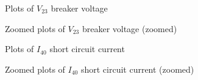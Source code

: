\documentclass[10pt, oneside, letterpaper]{article}
\begin{document}
\begin{figure}[H]
    \begin{center}
        
    \end{center}
    \caption{Plots of $V_{23}$ breaker voltage}
    \label{breaker_v_plots}
\end{figure}

\begin{figure}[H]
    \begin{center}
        
    \end{center}
    \caption{Zoomed plots of $V_{23}$ breaker voltage (zoomed)}
    \label{breaker_v_plots_zoom}
\end{figure}

\begin{figure}[H]
    \begin{center}
        
    \end{center}
    \caption{Plots of $I_{40}$ short circuit current}
    \label{short_circuit_i_plots}
\end{figure}

\begin{figure}[H]
    \begin{center}
        
    \end{center}
    \caption{Zoomed plots of $I_{40}$ short circuit current (zoomed)}
    \label{short_circuit_i_plots_zoom}
\end{figure}
\end{document}

